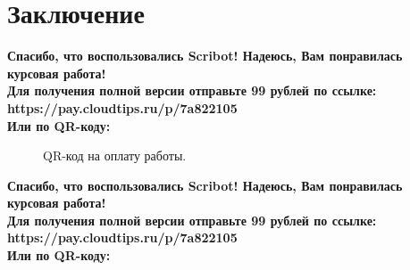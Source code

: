\documentclass{article}
\begin{document}
\section{Заключение}
\begin{center}
    \textbf{
        Спасибо, что воспользовались Scribot! Надеюсь, Вам понравилась курсовая работа!\\
        Для получения полной версии отправьте 99 рублей по ссылке:\\
        https://pay.cloudtips.ru/p/7a822105\\
        Или по QR-коду:\\
    }
\end{center}
\begin{figure}[h]
    \caption{QR-код на оплату работы.}
    \label{ris:image}
\end{figure}
\newpage
\begin{center}
    \textbf{
        Спасибо, что воспользовались Scribot! Надеюсь, Вам понравилась курсовая работа!\\
        Для получения полной версии отправьте 99 рублей по ссылке:\\
        https://pay.cloudtips.ru/p/7a822105\\
        Или по QR-коду:\\
    }
\end{center}
\end{document}
